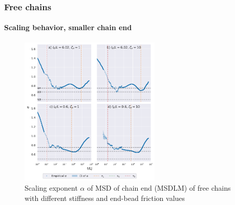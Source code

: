 \documentclass[handout]{beamer}
\begin{document}

\begin{frame}
    \frametitle{Free chains}
    \framesubtitle{Scaling behavior, smaller chain end}
    \begin{figure}
        \centering
        \includegraphics[width=0.6\textwidth]{17+18+19+20-exp-alpha-fm.png}
        \caption{Scaling exponent $\alpha$ of MSD of chain end (MSDLM) 
        of free chains with different stiffness and end-bead friction values
        }
        \label{fig:alpha_fm_free}
    \end{figure}
\end{frame}
\end{document}
